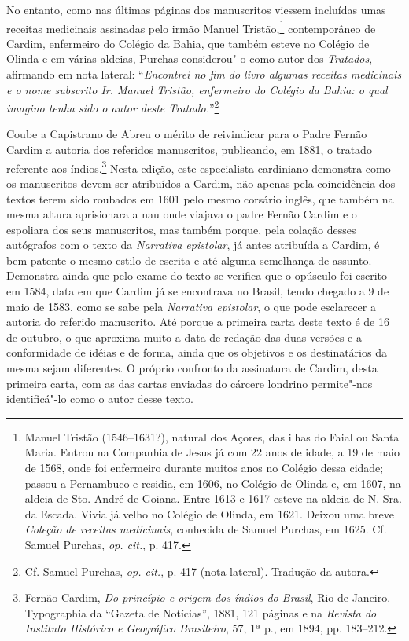 No entanto, como nas últimas páginas dos manuscritos viessem
incluídas umas receitas medicinais assinadas pelo irmão Manuel
Tristão,\footnote{ Manuel Tristão (1546--1631?), natural dos Açores,
das ilhas do Faial ou Santa Maria. Entrou na Companhia de Jesus já com
22 anos de idade, a 19 de maio de 1568, onde foi enfermeiro durante
muitos anos no Colégio dessa cidade; passou a Pernambuco e residia, em
1606, no Colégio de Olinda e, em 1607, na aldeia de Sto. André de
Goiana. Entre 1613 e 1617 esteve na aldeia de N. Sra. da Escada. Vivia já
velho no Colégio de Olinda, em 1621. Deixou uma breve 
\textit{Coleção de receitas medicinais}, conhecida de Samuel Purchas, em 1625. Cf.
Samuel Purchas, \textit{op. cit.}, p. 417.} contemporâneo de Cardim,
enfermeiro do Colégio da Bahia, que também esteve no Colégio de Olinda
e em várias aldeias, Purchas considerou"-o como autor dos
\textit{Tratados}, afirmando em nota lateral: ``\textit{Encontrei 
no fim do livro algumas receitas medicinais e o nome subscrito
Ir. Manuel Tristão, enfermeiro do Colégio da Bahia: o qual imagino
tenha sido o autor deste Tratado.}''\footnote{ Cf. Samuel
Purchas, \textit{op. cit.}, p. 417 (nota lateral). Tradução da autora.}

Coube a Capistrano de Abreu o mérito de reivindicar para o
Padre Fernão Cardim a autoria dos referidos manuscritos, publicando, em
1881, o tratado referente aos índios.\footnote{ Fernão Cardim,
\textit{Do princípio e origem dos índios do Brasil}, Rio de Janeiro.
Typographia da ``Gazeta de Notícias'', 1881, 121 páginas e na
\textit{Revista do Instituto Histórico e Geográfico Brasileiro}, 57,
1ª p., em 1894, pp. 183--212.} Nesta edição, este especialista cardiniano
demonstra como os manuscritos devem ser atribuídos a Cardim, não apenas
pela coincidência dos textos terem sido roubados em 1601 pelo mesmo
corsário inglês, que também na mesma altura aprisionara a nau onde
viajava o padre Fernão Cardim e o espoliara dos seus manuscritos, mas
também porque, pela colação desses autógrafos com o texto da
\textit{Narrativa epistolar}, já antes atribuída a Cardim, é bem
patente o mesmo estilo de escrita e até alguma semelhança de assunto.
Demonstra ainda que pelo exame do texto se verifica que o opúsculo
foi escrito em 1584, data em que Cardim já se encontrava no Brasil,
tendo chegado a 9 de maio de 1583, como se sabe pela \textit{Narrativa epistolar}, 
o que pode esclarecer a autoria do referido manuscrito. Até
porque a primeira carta deste texto é de 16 de outubro, o que aproxima
muito a data de redação das duas versões e a conformidade de idéias e
de forma, ainda que os objetivos e os destinatários da mesma sejam diferentes.
O próprio confronto da assinatura de Cardim, desta primeira carta, com as das 
cartas enviadas do cárcere londrino permite"-nos identificá"-lo como o autor desse texto.   

